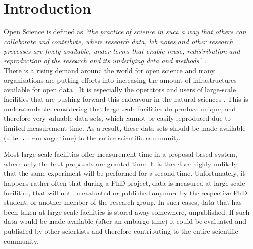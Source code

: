 \documentclass[aps,reprint,amsmath,amssymb,superscriptaddress]{revtex4-1}
\begin{document}
\maketitle



\section{Introduction}

Open Science is defined as \emph{``the practice of science in such a way that others can collaborate and contribute, where research data, lab notes and other research processes are freely available, under terms that enable reuse, redistribution and reproduction of the research and its underlying data and methods''} \cite{foster}.\\

There is a rising demand around the world for open science and many organisations are putting efforts into increasing the amount of infrastructures available for open data \cite{plos, sharing, panosc, nfdi, expands}. 
It is especially the operators and users of large-scale facilities that are pushing forward this endeavour in the natural sciences \cite{panosc, nfdi, expands}.
This is understandable, considering that large-scale facilities do produce unique, and therefore very valuable data sets, which cannot be easily reproduced due to limited measurement time. As a result, these data sets should be made available (after an embargo time) to the entire scientific community. 

Most large-scale facilities offer measurement time in a proposal based system, where only the best proposals are granted time.
It is therefore highly unlikely that the same experiment will be performed for a second time. 
Unfortunately, it happens rather often that during a PhD project, data is measured at large-scale facilities, that will not be evaluated or published anymore by the respective PhD student, or another member of the research group.
In such cases, data that has been taken at large-scale facilities is stored away somewhere, unpublished.
If such data would be made available (after an embargo time) it could be evaluated and published by other scientists and therefore contributing to the entire scientific community.
\end{document}
